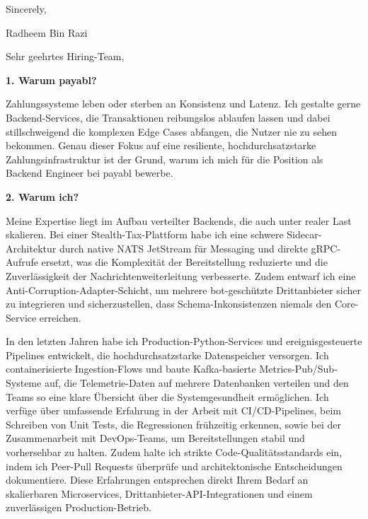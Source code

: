 \documentclass[11pt,a4paper]{coverletter}
\begin{document}
\closing{Sincerely,}{Radheem Bin Razi}

\clearpage
{}


\opening{Sehr geehrtes Hiring-Team,}

\vspace{8pt}\noindent\textbf{1. Warum payabl?}\par\vspace{3pt}

Zahlungssysteme leben oder sterben an Konsistenz und Latenz. Ich gestalte gerne Backend-Services, die Transaktionen reibungslos ablaufen lassen und dabei stillschweigend die komplexen Edge Cases abfangen, die Nutzer nie zu sehen bekommen. Genau dieser Fokus auf eine resiliente, hochdurchsatzstarke Zahlungsinfrastruktur ist der Grund, warum ich mich für die Position als Backend Engineer bei payabl bewerbe.

\vspace{8pt}\noindent\textbf{2. Warum ich?}\par\vspace{3pt}

Meine Expertise liegt im Aufbau verteilter Backends, die auch unter realer Last skalieren. Bei einer Stealth-Tax-Plattform habe ich eine schwere Sidecar-Architektur durch native NATS JetStream für Messaging und direkte gRPC-Aufrufe ersetzt, was die Komplexität der Bereitstellung reduzierte und die Zuverlässigkeit der Nachrichtenweiterleitung verbesserte. Zudem entwarf ich eine Anti-Corruption-Adapter-Schicht, um mehrere bot-geschützte Drittanbieter sicher zu integrieren und sicherzustellen, dass Schema-Inkonsistenzen niemals den Core-Service erreichen.

In den letzten Jahren habe ich Production-Python-Services und ereignisgesteuerte Pipelines entwickelt, die hochdurchsatzstarke Datenspeicher versorgen. Ich containerisierte Ingestion-Flows und baute Kafka-basierte Metrics-Pub/Sub-Systeme auf, die Telemetrie-Daten auf mehrere Datenbanken verteilen und den Teams so eine klare Übersicht über die Systemgesundheit ermöglichen. Ich verfüge über umfassende Erfahrung in der Arbeit mit CI/CD-Pipelines, beim Schreiben von Unit Tests, die Regressionen frühzeitig erkennen, sowie bei der Zusammenarbeit mit DevOps-Teams, um Bereitstellungen stabil und vorhersehbar zu halten. Zudem halte ich strikte Code-Qualitätsstandards ein, indem ich Peer-Pull Requests überprüfe und architektonische Entscheidungen dokumentiere. Diese Erfahrungen entsprechen direkt Ihrem Bedarf an skalierbaren Microservices, Drittanbieter-API-Integrationen und einem zuverlässigen Production-Betrieb.
\end{document}
